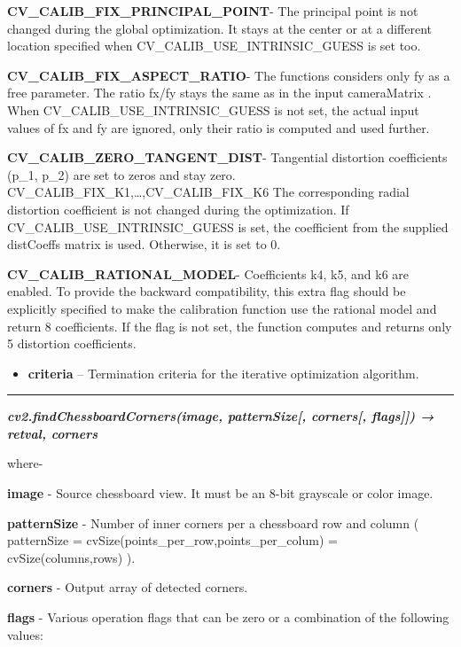 \documentclass[]{article}
\providecommand{\tightlist}{%
  \setlength{\itemsep}{0pt}\setlength{\parskip}{0pt}}
\begin{document}
\textbf{CV\_CALIB\_FIX\_PRINCIPAL\_POINT}- The principal point is not
changed during the global optimization. It stays at the center or at a
different location specified when CV\_CALIB\_USE\_INTRINSIC\_GUESS is
set too.

\textbf{CV\_CALIB\_FIX\_ASPECT\_RATIO}- The functions considers only fy
as a free parameter. The ratio fx/fy stays the same as in the input
cameraMatrix . When CV\_CALIB\_USE\_INTRINSIC\_GUESS is not set, the
actual input values of fx and fy are ignored, only their ratio is
computed and used further.

\textbf{CV\_CALIB\_ZERO\_TANGENT\_DIST}- Tangential distortion
coefficients (p\_1, p\_2) are set to zeros and stay zero.
CV\_CALIB\_FIX\_K1,\ldots{},CV\_CALIB\_FIX\_K6 The corresponding radial
distortion coefficient is not changed during the optimization. If
CV\_CALIB\_USE\_INTRINSIC\_GUESS is set, the coefficient from the
supplied distCoeffs matrix is used. Otherwise, it is set to 0.

\textbf{CV\_CALIB\_RATIONAL\_MODEL}- Coefficients k4, k5, and k6 are
enabled. To provide the backward compatibility, this extra flag should
be explicitly specified to make the calibration function use the
rational model and return 8 coefficients. If the flag is not set, the
function computes and returns only 5 distortion coefficients.

\begin{itemize}
\tightlist
\item
  \textbf{criteria} -- Termination criteria for the iterative
  optimization algorithm.
\end{itemize}

\begin{center}\rule{0.5\linewidth}{\linethickness}\end{center}

\emph{\textbf{cv2.findChessboardCorners(image, patternSize{[},
corners{[}, flags{]}{]}) → retval, corners}}

where-

\textbf{image} - Source chessboard view. It must be an 8-bit grayscale
or color image.

\textbf{patternSize} - Number of inner corners per a chessboard row and
column ( patternSize = cvSize(points\_per\_row,points\_per\_colum) =
cvSize(columns,rows) ).

\textbf{corners} - Output array of detected corners.

\textbf{flags} - Various operation flags that can be zero or a
combination of the following values:
\end{document}
